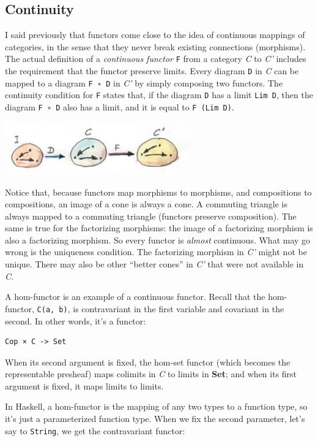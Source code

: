 \subsection{Continuity}\label{continuity}

I said previously that functors come close to the idea of continuous
mappings of categories, in the sense that they never break existing
connections (morphisms). The actual definition of a \emph{continuous
functor} \texttt{F} from a category \emph{C} to \emph{C'} includes the
requirement that the functor preserve limits. Every diagram \texttt{D}
in \emph{C} can be mapped to a diagram \texttt{F\ ∘\ D} in \emph{C'} by
simply composing two functors. The continuity condition for \texttt{F}
states that, if the diagram \texttt{D} has a limit \texttt{Lim\ D}, then
the diagram \texttt{F\ ∘\ D} also has a limit, and it is equal to
\texttt{F\ (Lim\ D)}.

\includegraphics[width=3.12500in]{images/continuity.jpg}

Notice that, because functors map morphisms to morphisms, and
compositions to compositions, an image of a cone is always a cone. A
commuting triangle is always mapped to a commuting triangle (functors
preserve composition). The same is true for the factorizing morphisms:
the image of a factorizing morphism is also a factorizing morphism. So
every functor is \emph{almost} continuous. What may go wrong is the
uniqueness condition. The factorizing morphism in \emph{C'} might not be
unique. There may also be other ``better cones'' in \emph{C'} that were
not available in \emph{C}.

A hom-functor is an example of a continuous functor. Recall that the
hom-functor, \texttt{C(a,\ b)}, is contravariant in the first variable
and covariant in the second. In other words, it's a functor:

\begin{verbatim}
Cop × C -> Set
\end{verbatim}

When its second argument is fixed, the hom-set functor (which becomes
the representable presheaf) maps colimits in \emph{C} to limits in
\textbf{Set}; and when its first argument is fixed, it maps limits to
limits.

In Haskell, a hom-functor is the mapping of any two types to a function
type, so it's just a parameterized function type. When we fix the second
parameter, let's say to \texttt{String}, we get the contravariant
functor:

